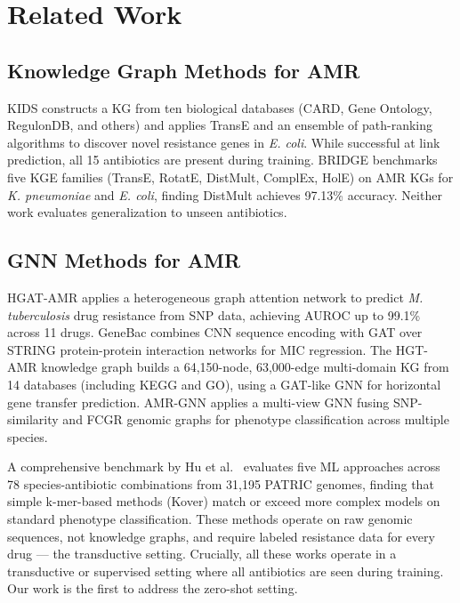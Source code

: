 \documentclass[conference]{IEEEtran}
\begin{document}
\begin{itemize}
\end{itemize}

\section{Related Work}

\subsection{Knowledge Graph Methods for AMR}

KIDS \cite{youn2022kids} constructs a KG from ten biological databases (CARD, Gene Ontology, RegulonDB, and others) and applies TransE and an ensemble of path-ranking algorithms to discover novel resistance genes in \textit{E. coli}. While successful at link prediction, all 15 antibiotics are present during training. BRIDGE \cite{bessadok2026bridge} benchmarks five KGE families (TransE, RotatE, DistMult, ComplEx, HolE) on AMR KGs for \textit{K. pneumoniae} and \textit{E. coli}, finding DistMult achieves 97.13\% accuracy. Neither work evaluates generalization to unseen antibiotics.

\subsection{GNN Methods for AMR}

HGAT-AMR \cite{nguyen2021hgat} applies a heterogeneous graph attention network to predict \textit{M. tuberculosis} drug resistance from SNP data, achieving AUROC up to 99.1\% across 11 drugs. GeneBac \cite{morrish2024genebac} combines CNN sequence encoding with GAT over STRING protein-protein interaction networks for MIC regression. The HGT-AMR knowledge graph \cite{hgtamrkg2025} builds a 64,150-node, 63,000-edge multi-domain KG from 14 databases (including KEGG and GO), using a GAT-like GNN for horizontal gene transfer prediction. AMR-GNN \cite{amrgnn2026} applies a multi-view GNN fusing SNP-similarity and FCGR genomic graphs for phenotype classification across multiple species.

A comprehensive benchmark by Hu et al.\ \cite{hu2024benchmark} evaluates five ML approaches across 78 species-antibiotic combinations from 31,195 PATRIC genomes, finding that simple k-mer-based methods (Kover) match or exceed more complex models on standard phenotype classification. These methods operate on raw genomic sequences, not knowledge graphs, and require labeled resistance data for every drug --- the transductive setting. Crucially, all these works operate in a transductive or supervised setting where all antibiotics are seen during training. Our work is the first to address the zero-shot setting.
\end{document}
